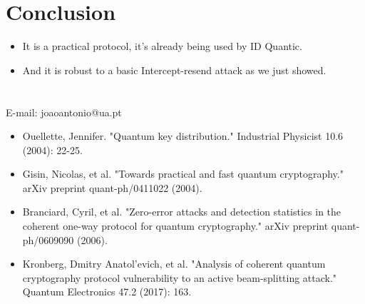 \documentclass[1000pt]{article}
\newcommand{\mysection}[1]{\section*{\color{black}\sffamily #1}}%
\begin{document}
\mysection{\Huge\textbf{Conclusion}} \Large \vspace*{1cm}
\begin{itemize}
\item It is a practical protocol, it's already being used by ID Quantic.
\item And it is robust to a basic Intercept-resend attack as we just showed.
\end{itemize}
\mysection{} \sffamily \Large
\vspace{-10mm}
\centerline{E-mail: joaoantonio@ua.pt}
\vspace*{7cm}
\begin{itemize}
	\item Ouellette, Jennifer. "Quantum key distribution." Industrial Physicist 10.6 (2004): 22-25.
	\item Gisin, Nicolas, et al. "Towards practical and fast quantum cryptography." arXiv preprint quant-ph/0411022 (2004).
	\item Branciard, Cyril, et al. "Zero-error attacks and detection statistics in the coherent one-way protocol for quantum cryptography." arXiv preprint quant-ph/0609090 (2006).
	\item Kronberg, Dmitry Anatol'evich, et al. "Analysis of coherent quantum cryptography protocol vulnerability to an active beam-splitting attack." Quantum Electronics 47.2 (2017): 163.
\end{itemize}
\end{document}
